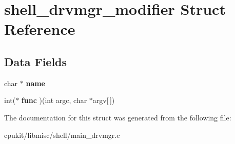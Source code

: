\hypertarget{structshell__drvmgr__modifier}{}\section{shell\+\_\+drvmgr\+\_\+modifier Struct Reference}
\label{structshell__drvmgr__modifier}
\subsection*{Data Fields}
\begin{DoxyCompactItemize}
\item 
\mbox{\label{structshell__drvmgr__modifier_af74093e471e3433b10e9f3903dfb4896}} 
char $\ast$ {\bfseries name}
\item 
\mbox{\label{structshell__drvmgr__modifier_a66ff5ee0a92b464bfd4461194f757dd2}} 
int($\ast$ {\bfseries func} )(int argc, char $\ast$argv\mbox{[}$\,$\mbox{]})
\end{DoxyCompactItemize}


The documentation for this struct was generated from the following file\+:\begin{DoxyCompactItemize}
\item 
cpukit/libmisc/shell/main\+\_\+drvmgr.\+c\end{DoxyCompactItemize}
